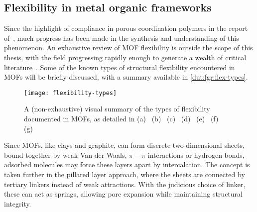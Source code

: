 \subsection{Flexibility in metal organic frameworks}

Since the highlight of compliance in porous coordination polymers 
in the report of~\citet{kitagawaFunctionalPorousCoordination2004},
much progress has been made in the synthesis and understanding
of this phenomenon. An exhaustive review of MOF flexibility is 
outside the scope of this thesis, with the field progressing 
rapidly enough to generate a wealth of critical
literature~\cite{schneemannFlexibleMetalOrganic2014, %
fereyHybridPorousSolids2008, liMetalOrganicFrameworks2012, %
haldarInterpenetrationCoordinationPolymers2015, %
stassenUpdatedRoadmapIntegration2017, %
vanduyfhuysThermodynamicInsightStimuliresponsive2018, %
murdockApproachesSynthesizingBreathing2014}.
Some of the known types of structural flexibility encountered in MOFs
will be briefly discussed, with a summary available in 
\autoref{dut:fgr:flex-types}. 

\begin{figure}[htb]
    \centering
    
    \texttt{[image: flexibility-types]}%
    \caption{A (non-exhaustive) visual summary of the types of
    flexibility documented in MOFs, as detailed in 
    (a)~\citet{liHydrogenBondregulatedMicroporous2001}
    (b)~\citet{kitauraPorousCoordinationPolymerCrystals2003}
    (c)~\citet{kitauraPillaredLayerCoordinationPolymer2002}
    (d)~\citet{kepertVersatileFamilyInterconvertible2000,%
    kitauraPorousCoordinationPolymerCrystals2003}
    (e)~\citet{nelsonSupercriticalProcessingRoute2009}
    (f)~\citet{fairen-jimenezOpeningGateFramework2011}
    (g)~\citet{bourrellyDifferentAdsorptionBehaviors2005, %
    serreExplanationVeryLarge2007}}%
    \label{dut:fgr:flex-types}
    
\end{figure}

Since MOFs, like clays and graphite, can form discrete 
two-dimensional sheets, bound together by weak Van-der-Waals,
\( \pi-\pi \) interactions or hydrogen bonds,
adsorbed molecules may force these layers apart by 
intercalation. The concept is taken further in the 
pillared layer approach, where the sheets are connected 
by tertiary linkers instead of weak attractions. With the 
judicious choice of linker, these can act as springs, allowing
pore expansion while maintaining structural integrity.

